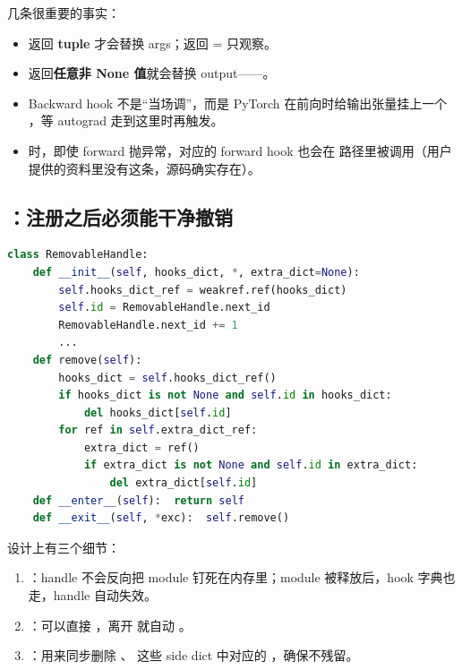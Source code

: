几条很重要的事实：

\begin{itemize}[leftmargin=1.5em]
  \item {} 返回 \textbf{tuple} 才会替换 args；返回  = 只观察。
  \item {} 返回\textbf{任意非 None 值}就会替换 output——。
  \item Backward hook 不是“当场调”，而是 PyTorch 在前向时给输出张量挂上一个 ，等 autograd 走到这里时再触发。
  \item {} 时，即使 forward 抛异常，对应的 forward hook 也会在  路径里被调用（用户提供的资料里没有这条，源码确实存在）。
\end{itemize}

\subsection{：注册之后必须能干净撤销}

\begin{lstlisting}[language=Python, caption=torch/utils/hooks.py 中的 RemovableHandle 节选]
class RemovableHandle:
    def __init__(self, hooks_dict, *, extra_dict=None):
        self.hooks_dict_ref = weakref.ref(hooks_dict)
        self.id = RemovableHandle.next_id
        RemovableHandle.next_id += 1
        ...
    def remove(self):
        hooks_dict = self.hooks_dict_ref()
        if hooks_dict is not None and self.id in hooks_dict:
            del hooks_dict[self.id]
        for ref in self.extra_dict_ref:
            extra_dict = ref()
            if extra_dict is not None and self.id in extra_dict:
                del extra_dict[self.id]
    def __enter__(self):  return self
    def __exit__(self, *exc):  self.remove()
\end{lstlisting}

设计上有三个细节：

\begin{enumerate}[leftmargin=1.5em]
  \item {}：handle 不会反向把 module 钉死在内存里；module 被释放后，hook 字典也走，handle 自动失效。
  \item {}：可以直接 ，离开  就自动 。
  \item {}：用来同步删除 、 这些 side dict 中对应的 ，确保不残留。
\end{enumerate}

